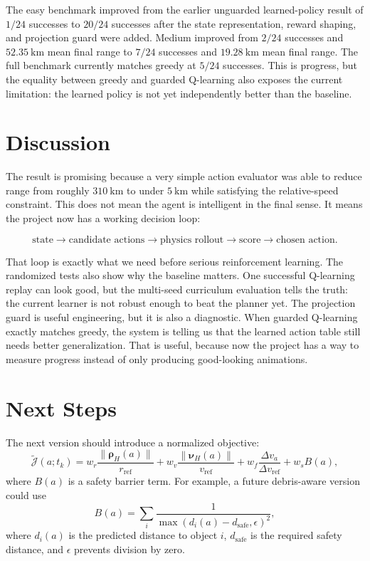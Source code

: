 \documentclass[11pt]{article}
\begin{document}
The easy benchmark improved from the earlier unguarded learned-policy result of \(1/24\) successes to \(20/24\) successes after the state representation, reward shaping, and projection guard were added.
Medium improved from \(2/24\) successes and \(52.35~\mathrm{km}\) mean final range to \(7/24\) successes and \(19.28~\mathrm{km}\) mean final range.
The full benchmark currently matches greedy at \(5/24\) successes.
This is progress, but the equality between greedy and guarded Q-learning also exposes the current limitation: the learned policy is not yet independently better than the baseline.

\section{Discussion}

The result is promising because a very simple action evaluator was able to reduce range from roughly \(310~\mathrm{km}\) to under \(5~\mathrm{km}\) while satisfying the relative-speed constraint.
This does not mean the agent is intelligent in the final sense.
It means the project now has a working decision loop:

\[
    \text{state}
    \rightarrow
    \text{candidate actions}
    \rightarrow
    \text{physics rollout}
    \rightarrow
    \text{score}
    \rightarrow
    \text{chosen action}.
\]

That loop is exactly what we need before serious reinforcement learning.
The randomized tests also show why the baseline matters.
One successful Q-learning replay can look good, but the multi-seed curriculum evaluation tells the truth: the current learner is not robust enough to beat the planner yet.
The projection guard is useful engineering, but it is also a diagnostic.
When guarded Q-learning exactly matches greedy, the system is telling us that the learned action table still needs better generalization.
That is useful, because now the project has a way to measure progress instead of only producing good-looking animations.

\section{Next Steps}

The next version should introduce a normalized objective:
\[
    \tilde{\mathcal J}(a;t_k)
    =
    w_r \frac{\|\boldsymbol\rho_H(a)\|}{r_{\mathrm{ref}}}
    +
    w_v \frac{\|\boldsymbol\nu_H(a)\|}{v_{\mathrm{ref}}}
    +
    w_f \frac{\Delta v_a}{\Delta v_{\mathrm{ref}}}
    +
    w_s B(a),
\]
where \(B(a)\) is a safety barrier term.
For example, a future debris-aware version could use
\[
    B(a)
    =
    \sum_i
    \frac{1}{\max(d_i(a)-d_{\mathrm{safe}}, \epsilon)^2},
\]
where \(d_i(a)\) is the predicted distance to object \(i\), \(d_{\mathrm{safe}}\) is the required safety distance, and \(\epsilon\) prevents division by zero.
\end{document}
